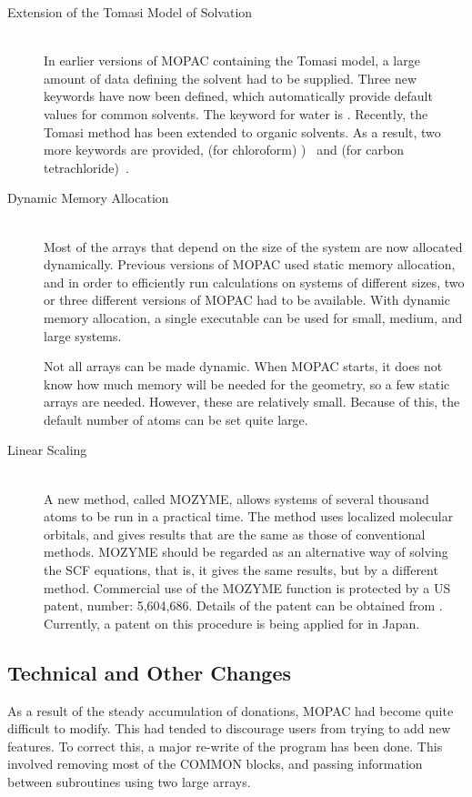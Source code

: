 \begin{description}
\item[Extension of the Tomasi Model of Solvation]~\\
In earlier versions of MOPAC containing the Tomasi model, a large amount of
data defining the solvent had to be supplied. Three new keywords have now been
defined, which automatically provide default values for common solvents. The
keyword for water is .  Recently, the Tomasi method has been extended
to organic solvents.  As a result, two more keywords are provided, 
(for chloroform) )~\cite{chcl3} and   (for carbon
tetrachloride)~\cite{ccl4}.

\item[Dynamic Memory Allocation]~\\
Most of the arrays that depend on the size of the system are now allocated
dynamically.  Previous versions of MOPAC used static memory allocation, and in
order to efficiently run calculations on systems of different  sizes, two or
three different versions of MOPAC had to be available.  With dynamic memory
allocation, a single executable can be used for small, medium, and large
systems.

Not all arrays can be made dynamic.  When MOPAC starts, it does not know how
much memory will be needed for the geometry, so a  few static arrays are
needed.  However, these are relatively small.  Because of this, the default
number of atoms can be set quite large.

\item[Linear Scaling]~\\
A new method, called MOZYME, allows systems of several thousand atoms to be
run  in a practical time.  The method uses localized molecular orbitals, and
gives  results that are the same as those of conventional methods.  MOZYME
should be regarded as an alternative way of solving the SCF equations, that is,
it gives the same results, but by a different method.  Commercial use of the
MOZYME  function is protected by a US patent, number: 5,604,686.  Details of
the patent can be obtained from
.
Currently, a patent  on this procedure is being applied for in Japan.
\end{description}

\subsection{Technical and Other Changes}
As a result of the steady accumulation of donations, MOPAC had become quite
difficult to modify.  This had tended to discourage users from trying to add
new features.  To correct this, a major re-write of the program has been done.
This involved removing  most of the COMMON blocks, and passing information
between subroutines using two large arrays.

